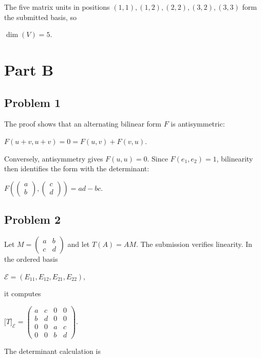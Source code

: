 The five matrix units in positions \(\left( {1,1} \right),\left( {1,2} \right),\left( {2,2} \right),\left( {3,2} \right),\left( {3,3} \right)\) form the submitted basis, so

\(\dim(V) = 5.\)

\chapter{Part B}

\section{Problem 1}

The proof shows that an alternating bilinear form \(F\) is antisymmetric:

\(F\left( {u + v,u + v} \right) = 0 = F\left( {u,v} \right) + F\left( {v,u} \right).\)

Conversely, antisymmetry gives \(F\left( {u,u} \right) = 0\). Since \(F\left( {e_{1},e_{2}} \right) = 1\), bilinearity then identifies the form with the determinant:

\(F\left( {\begin{pmatrix}
a \\
b
\end{pmatrix},\begin{pmatrix}
c \\
d
\end{pmatrix}} \right) = ad - bc.\)

\section{Problem 2}

Let \(M = \begin{pmatrix}
a & b \\
c & d
\end{pmatrix}\) and let \(T(A) = AM\). The submission verifies linearity. In the ordered basis

\(\mathcal{E} = \left( {E_{11},E_{12},E_{21},E_{22}} \right),\)

it computes

\(\lbrack T\rbrack_{\mathcal{E}} = \begin{pmatrix}
a & c & 0 & 0 \\
b & d & 0 & 0 \\
0 & 0 & a & c \\
0 & 0 & b & d
\end{pmatrix}.\)

The determinant calculation is

